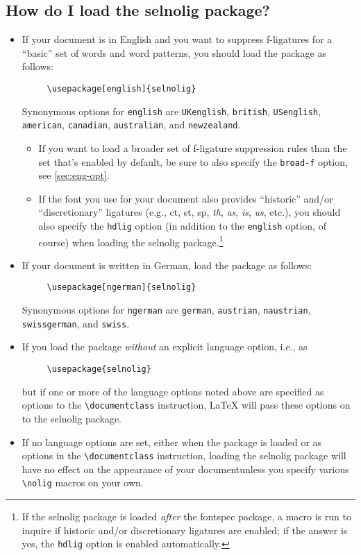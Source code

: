\documentclass[12pt]{article}
\newcommand{\pkg}[1]{\textsf{#1}}
\newcommand{\opt}[1]{\texttt{#1}}
\newcommand{\cmmd}[1]{\texttt{\textbackslash #1}}
\begin{document}
\subsection[How do I load the selnolig package?]{How do I load the \pkg{selnolig} package?}

\begin{itemize}
\item If your document is in English and you want to suppress f-ligatures for a \enquote{basic} set of words and word patterns, you should load the package as follows:
\begin{Verbatim}
     \usepackage[english]{selnolig}
\end{Verbatim}
Synonymous options for \opt{english} are \opt{UKenglish}, \opt{british}, \opt{USenglish}, \opt{american}, \opt{cana\-dian}, \opt{australian}, and \opt{new\-zealand}.

\begin{itemize}
\item If you want to load a broader set of f-ligature suppression rules than the set that's enabled by default, be sure to also specify the \opt{broad-f} option, see \cref{sec:eng-opt}.

\item If the font you use for your document also provides \enquote{historic} and/or \enquote{discretionary} ligatures (e.g., ct, st, sp, \emph{th}, \emph{as}, \emph{is}, \emph{us}, etc.), you should also specify the \opt{hdlig} option (in addition to the \opt{english} option, of course) when loading the \pkg{selnolig} package.\footnote{If the \pkg{selnolig} package is loaded \emph{after} the \pkg{fontspec} package, a macro is run to inquire if historic and/or discretionary ligatures are enabled; if the answer is yes, the \opt{hdlig} option is enabled automatically.}
\end{itemize}
\item If your document is written in German, load the package as follows:
\begin{Verbatim}
     \usepackage[ngerman]{selnolig}
\end{Verbatim}
Synonymous options for \opt{ngerman} are \opt{german}, \opt{austrian}, \opt{naustrian},  \opt{swissgerman}, and \opt{swiss}.

\item If you load the package \emph{without} an explicit language option, i.e., as
\begin{Verbatim}
     \usepackage{selnolig}
\end{Verbatim}
but if one or more of the language options noted above are specified as options to the \cmmd{documentclass} instruction, LaTeX will pass these options on to the \pkg{selnolig} package.

\item If no language options are set, either when the package is loaded or as options in the \cmmd{documentclass} instruction, loading the \pkg{selnolig} package will have no effect on the appearance of your document\textemdash unless you specify various \cmmd{nolig} macros on your own.
\end{itemize}
\end{document}
